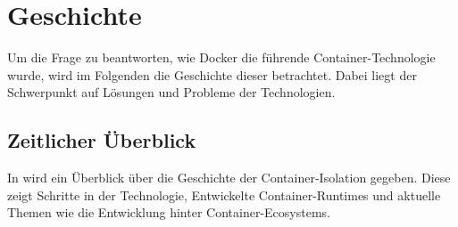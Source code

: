 \chapter{Geschichte}
\label{chap:geschichte}
Um die Frage zu beantworten, wie Docker die führende Container-Technologie wurde, wird im Folgenden die Geschichte dieser betrachtet. Dabei liegt der Schwerpunkt auf Lösungen und Probleme der Technologien.
\section{Zeitlicher Überblick}
\label{sec:timeline}
 
In  wird ein Überblick über die Geschichte der Container-Isolation gegeben. Diese zeigt Schritte in der Technologie, Entwickelte Container-Runtimes und aktuelle Themen wie die Entwicklung hinter Container-Ecosystems.
 
